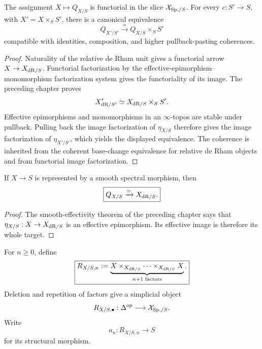 \begin{proposition}
\label{prop:monadic-de-rham-quotient-base-change}
The assignment \(X\mapsto Q_{X/S}\) is functorial in the slice
\(\mathcal X_{\mathrm{Sp},/S}\).  For every \(c:S'\to S\), with
\(X'=X\times_SS'\), there is a canonical equivalence
\[
\boxed{
    Q_{X'/S'}\xrightarrow{\simeq}Q_{X/S}\times_SS'
}
\]
compatible with identities, composition, and higher pullback-pasting coherences.
\end{proposition}

\begin{proof}
Naturality of the relative de Rham unit gives a functorial arrow
\(X\to X_{\mathrm{dR}/S}\).  Functorial factorization by the
effective-epimorphism--monomorphism factorization system gives the functoriality of its image.
The preceding chapter proves
\[
    X'_{\mathrm{dR}/S'}\simeq X_{\mathrm{dR}/S}\times_SS'.
\]
Effective epimorphisms and monomorphisms in an \(\infty\)-topos are stable under pullback.  Pulling
back the image factorization of \(\eta_{X/S}\) therefore gives the image factorization of
\(\eta_{X'/S'}\), which yields the displayed equivalence.  The coherence is inherited from the
coherent base-change equivalence for relative de Rham objects and from functorial image
factorization.
\end{proof}

\begin{theorem}
\label{thm:monadic-de-rham-smooth-effectivity}
If \(X\to S\) is represented by a smooth spectral morphism, then
\[
\boxed{
    Q_{X/S}\xrightarrow{\simeq}X_{\mathrm{dR}/S}.
}
\]
\end{theorem}

\begin{proof}
The smooth-effectivity theorem of the preceding chapter says that
\(\eta_{X/S}:X\to X_{\mathrm{dR}/S}\) is an effective epimorphism.  Its effective image is therefore its
whole target.
\end{proof}

\begin{definition}
For \(n\geq0\), define
\[
\boxed{
    R_{X/S,n}
    :=
    \underbrace{
        X\times_{X_{\mathrm{dR}/S}}\cdots\times_{X_{\mathrm{dR}/S}}X
    }_{n+1\text{ factors}}.
}
\]
Deletion and repetition of factors give a simplicial object
\[
    R_{X/S,\bullet}:\Delta^{\mathrm{op}}\longrightarrow\mathcal X_{\mathrm{Sp},/S}.
\]
Write
\[
    a_n:R_{X/S,n}\longrightarrow S
\]
for its structural morphism.
\end{definition}

